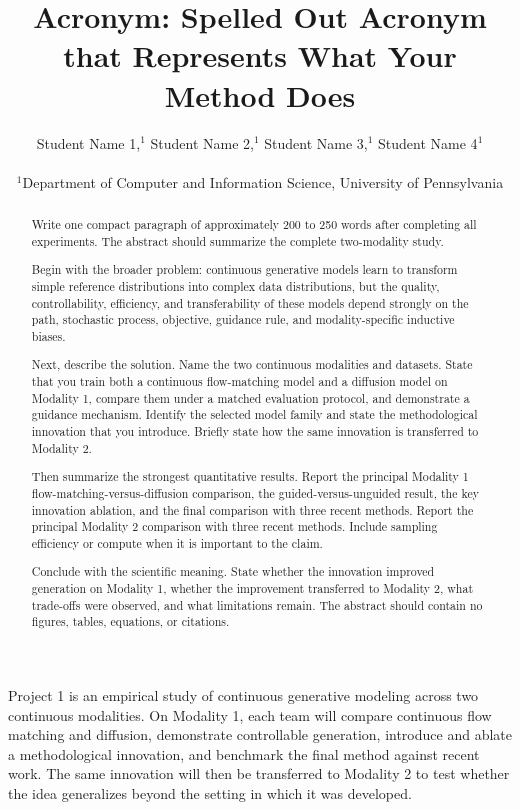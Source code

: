 \documentclass{article}
\title{Acronym: Spelled Out Acronym that Represents What Your Method Does}
\author{
  Student Name 1,$^{1}$ Student Name 2,$^{1}$ Student Name 3,$^{1}$ Student Name 4$^{1}$\\
  \\
  $^{1}$Department of Computer and Information Science, University of Pennsylvania
}
\newenvironment{projectone}{\begingroup\color{red}}{\endgroup}
\begin{document}
\maketitle

\begin{projectone}
Project 1 is an empirical study of continuous generative modeling across two continuous modalities. On Modality 1, each team will compare continuous flow matching and diffusion, demonstrate controllable generation, introduce and ablate a methodological innovation, and benchmark the final method against recent work. The same innovation will then be transferred to Modality 2 to test whether the idea generalizes beyond the setting in which it was developed.
\end{projectone}

\begin{abstract}

Write one compact paragraph of approximately 200 to 250 words after completing all experiments. The abstract should summarize the complete two-modality study.

Begin with the broader problem: continuous generative models learn to transform simple reference distributions into complex data distributions, but the quality, controllability, efficiency, and transferability of these models depend strongly on the path, stochastic process, objective, guidance rule, and modality-specific inductive biases.

Next, describe the solution. Name the two continuous modalities and datasets. State that you train both a continuous flow-matching model and a diffusion model on Modality 1, compare them under a matched evaluation protocol, and demonstrate a guidance mechanism. Identify the selected model family and state the methodological innovation that you introduce. Briefly state how the same innovation is transferred to Modality 2.

Then summarize the strongest quantitative results. Report the principal Modality 1 flow-matching-versus-diffusion comparison, the guided-versus-unguided result, the key innovation ablation, and the final comparison with three recent methods. Report the principal Modality 2 comparison with three recent methods. Include sampling efficiency or compute when it is important to the claim.

Conclude with the scientific meaning. State whether the innovation improved generation on Modality 1, whether the improvement transferred to Modality 2, what trade-offs were observed, and what limitations remain. The abstract should contain no figures, tables, equations, or citations.

\end{abstract}
\end{document}
